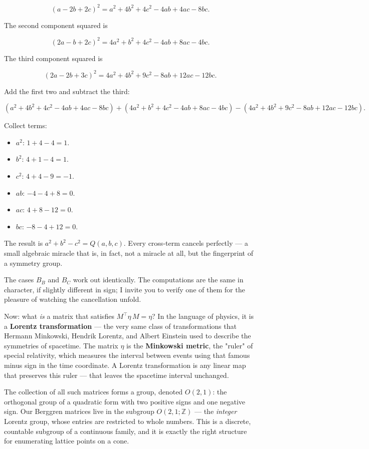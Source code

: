 \documentclass[11pt,twoside,openright]{book}
\theoremstyle{definition}
\theoremstyle{remark}
\begin{document}
\[(a - 2b + 2c)^2 = a^2 + 4b^2 + 4c^2 - 4ab + 4ac - 8bc.\]

The second component squared is

\[(2a - b + 2c)^2 = 4a^2 + b^2 + 4c^2 - 4ab + 8ac - 4bc.\]

The third component squared is

\[(2a - 2b + 3c)^2 = 4a^2 + 4b^2 + 9c^2 - 8ab + 12ac - 12bc.\]

Add the first two and subtract the third:

\[(a^2 + 4b^2 + 4c^2 - 4ab + 4ac - 8bc) + (4a^2 + b^2 + 4c^2 - 4ab + 8ac - 4bc) - (4a^2 + 4b^2 + 9c^2 - 8ab + 12ac - 12bc).\]

Collect terms:
\begin{itemize}
  \item $a^2$: $1 + 4 - 4 = 1$.
  \item $b^2$: $4 + 1 - 4 = 1$.
  \item $c^2$: $4 + 4 - 9 = -1$.
  \item $ab$: $-4 - 4 + 8 = 0$.
  \item $ac$: $4 + 8 - 12 = 0$.
  \item $bc$: $-8 - 4 + 12 = 0$.
\end{itemize}

The result is $a^2 + b^2 - c^2 = Q(a, b, c)$. Every cross-term cancels perfectly --- a small algebraic miracle that is, in fact, not a miracle at all, but the fingerprint of a symmetry group.

The cases $B_B$ and $B_C$ work out identically. The computations are the same in character, if slightly different in sign; I invite you to verify one of them for the pleasure of watching the cancellation unfold.

Now: what \textit{is} a matrix that satisfies $M^\top \eta\, M = \eta$? In the language of physics, it is a \textbf{Lorentz transformation} --- the very same class of transformations that Hermann Minkowski, Hendrik Lorentz, and Albert Einstein used to describe the symmetries of spacetime. The matrix $\eta$ is the \textbf{Minkowski metric}, the "ruler" of special relativity, which measures the interval between events using that famous minus sign in the time coordinate. A Lorentz transformation is any linear map that preserves this ruler --- that leaves the spacetime interval unchanged.

The collection of all such matrices forms a group, denoted $O(2, 1)$: the orthogonal group of a quadratic form with two positive signs and one negative sign. Our Berggren matrices live in the subgroup $O(2, 1; \mathbb{Z})$ --- the \textit{integer} Lorentz group, whose entries are restricted to whole numbers. This is a discrete, countable subgroup of a continuous family, and it is exactly the right structure for enumerating lattice points on a cone.
\end{document}
